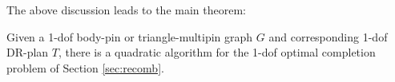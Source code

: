 The above discussion leads to the main theorem:
\begin{theorem}
\label{thm:1dofcase}
    Given a 1-dof body-pin or triangle-multipin graph $G$ and corresponding
    1-dof DR-plan $T$, there is a quadratic algorithm for the 1-dof optimal
    completion problem of Section \ref{sec:recomb}.
\end{theorem}






